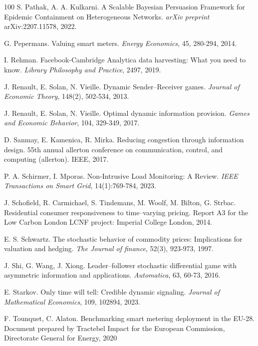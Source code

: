 \documentclass[a4paper,10pt]{article}
\theoremstyle{definition}
\theoremstyle{plain}
\numberwithin{equation}{section}
\begin{document}
\begin{thebibliography}{100}
S. Pathak,  A. A. Kulkarni.  A Scalable Bayesian Persuasion Framework for Epidemic Containment on Heterogeneous Networks. {\em arXiv preprint} arXiv:2207.11578, 2022.

G. Pepermans. Valuing smart meters. {\em Energy Economics}, 45, 280-294, 2014.

I. Rehman. Facebook-Cambridge Analytica data harvesting: What you need to know. {\em Library Philosophy and Practice}, 2497, 2019.

J. Renault, E. Solan, N. Vieille. Dynamic Sender–Receiver games. {\em Journal of Economic Theory}, 148(2), 502-534, 2013.

J. Renault, E. Solan, N. Vieille. Optimal dynamic information provision. {\em Games and Economic Behavior}, 104, 329-349, 2017.

D. Sanmay, E. Kamenica, R. Mirka.
\newblock Reducing congestion through information design.
\newblock 55th annual allerton conference on communication, control, and computing (allerton). IEEE, 2017.

P. A. Schirmer, I. Mporas. Non-Intrusive Load Monitoring: A Review. {\em IEEE Transactions on Smart Grid}, 14(1):769-784, 2023.

J. Schofield, R. Carmichael, S. Tindemans, M. Woolf, M. Bilton, G. Strbac.
\newblock Residential consumer responsiveness to time--varying pricing.
\newblock Report A3 for the Low Carbon London LCNF project: Imperial College London, 2014.

E. S. Schwartz. The stochastic behavior of commodity prices: Implications for valuation and hedging. {\em The Journal of finance}, 52(3), 923-973, 1997.

J. Shi, G. Wang, J. Xiong. Leader–follower stochastic differential game with asymmetric information and applications. {\em Automatica}, 63, 60-73, 2016.

E. Starkov. Only time will tell: Credible dynamic signaling. {\em Journal of Mathematical Economics}, 109, 102894, 2023.

F. Tounquet, C. Alaton. Benchmarking smart metering deployment in the EU-28. Document prepared by Tractebel Impact for the European Commission, Directorate General for Energy, 2020


\end{thebibliography}
\end{document}
